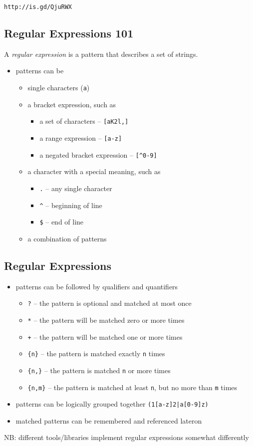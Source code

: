 \documentclass[xga]{xdvislides}
\begin{document}
\verb+http://is.gd/QjuRWX+

\subsection{Regular Expressions 101}
A {\em regular expression} is a pattern that describes a set of strings. \\

\begin{itemize}
	\item patterns can be
		\begin{itemize}
			\item single characters (\verb+a+)
			\item a bracket expression, such as
				\begin{itemize}
					\item a set of characters -- \verb+[aK2l,]+
					\item a range expression -- \verb+[a-z]+
					\item a negated bracket expression -- \verb+[^0-9]+
				\end{itemize}
			\item a character with a special meaning, such as
				\begin{itemize}
					\item \verb+.+ -- any single character
					\item \verb+^+ -- beginning of line
					\item \verb+$+ -- end of line
				\end{itemize}
			\item a combination of patterns
		\end{itemize}
\end{itemize}

\subsection{Regular Expressions}
\begin{itemize}
	\item patterns can be followed by qualifiers and quantifiers
		\begin{itemize}
			\item \verb+?+ -- the pattern is optional and matched at most once
			\item \verb+*+ -- the pattern will be matched zero or more times
			\item \verb|+| -- the pattern will be matched one or more times
			\item \verb+{n}+ -- the pattern is matched exactly \verb+n+ times
			\item \verb+{n,}+ -- the pattern is matched \verb+n+ or more times
			\item \verb+{n,m}+ -- the pattern is matched at least \verb+n+,
				but no more than \verb+m+ times
		\end{itemize}
	\item patterns can be logically grouped together \verb+(1[a-z]2|a[0-9]z)+
	\item matched patterns can be remembered and referenced lateron
\end{itemize}
\addvspace{.5in}
NB: different tools/libraries implement regular expressions somewhat differently
\end{document}
